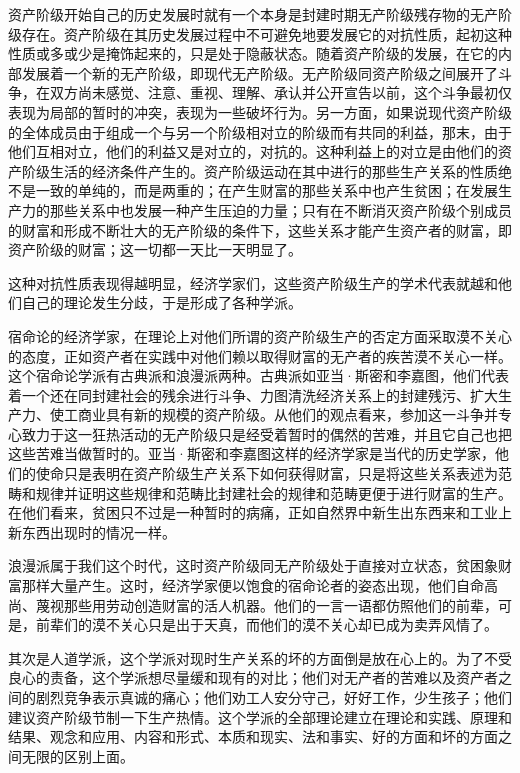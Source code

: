 \documentclass[a4paper,twoside,12pt,AutoFakeBold]{ctexart}
\begin{document}
资产阶级开始自己的历史发展时就有一个本身是封建时期无产阶级残存物的无产阶级存在。资产阶级在其历史发展过程中不可避免地要发展它的对抗性质，起初这种性质或多或少是掩饰起来的，只是处于隐蔽状态。随着资产阶级的发展，在它的内部发展着一个新的无产阶级，即现代无产阶级。无产阶级同资产阶级之间展开了斗争，在双方尚未感觉、注意、重视、理解、承认并公开宣告以前，这个斗争最初仅表现为局部的暂时的冲突，表现为一些破坏行为。另一方面，如果说现代资产阶级的全体成员由于组成一个与另一个阶级相对立的阶级而有共同的利益，那末，由于他们互相对立，他们的利益又是对立的，对抗的。这种利益上的对立是由他们的资产阶级生活的经济条件产生的。资产阶级运动在其中进行的那些生产关系的性质绝不是一致的单纯的，而是两重的；在产生财富的那些关系中也产生贫困；在发展生产力的那些关系中也发展一种产生压迫的力量；只有在不断消灭资产阶级个别成员的财富和形成不断壮大的无产阶级的条件下，这些关系才能产生资产者的财富，即资产阶级的财富；这一切都一天比一天明显了。

这种对抗性质表现得越明显，经济学家们，这些资产阶级生产的学术代表就越和他们自己的理论发生分歧，于是形成了各种学派。

宿命论的经济学家，在理论上对他们所谓的资产阶级生产的否定方面采取漠不关心的态度，正如资产者在实践中对他们赖以取得财富的无产者的疾苦漠不关心一样。这个宿命论学派有古典派和浪漫派两种。古典派如亚当·斯密和李嘉图，他们代表着一个还在同封建社会的残余进行斗争、力图清洗经济关系上的封建残污、扩大生产力、使工商业具有新的规模的资产阶级。从他们的观点看来，参加这一斗争并专心致力于这一狂热活动的无产阶级只是经受着暂时的偶然的苦难，并且它自己也把这些苦难当做暂时的。亚当·斯密和李嘉图这样的经济学家是当代的历史学家，他们的使命只是表明在资产阶级生产关系下如何获得财富，只是将这些关系表述为范畴和规律并证明这些规律和范畴比封建社会的规律和范畴更便于进行财富的生产。在他们看来，贫困只不过是一种暂时的病痛，正如自然界中新生出东西来和工业上新东西出现时的情况一样。

浪漫派属于我们这个时代，这时资产阶级同无产阶级处于直接对立状态，贫困象财富那样大量产生。这时，经济学家便以饱食的宿命论者的姿态出现，他们自命高尚、蔑视那些用劳动创造财富的活人机器。他们的一言一语都仿照他们的前辈，可是，前辈们的漠不关心只是出于天真，而他们的漠不关心却已成为卖弄风情了。

其次是人道学派，这个学派对现时生产关系的坏的方面倒是放在心上的。为了不受良心的责备，这个学派想尽量缓和现有的对比；他们对无产者的苦难以及资产者之间的剧烈竞争表示真诚的痛心；他们劝工人安分守己，好好工作，少生孩子；他们建议资产阶级节制一下生产热情。这个学派的全部理论建立在理论和实践、原理和结果、观念和应用、内容和形式、本质和现实、法和事实、好的方面和坏的方面之间无限的区别上面。
\end{document}
